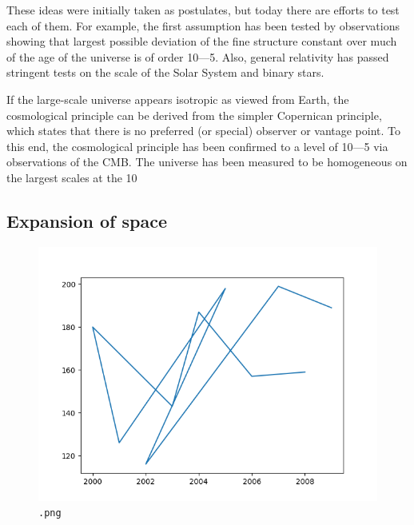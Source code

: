 \documentclass[14pt, oneside]{book}
\begin{document}
			These ideas were initially taken as postulates, but today there are efforts to test each of them. For example, the first assumption has been tested by observations showing that largest possible deviation of the fine structure constant over much of the age of the universe is of order 10---5. Also, general relativity has passed stringent tests on the scale of the Solar System and binary stars.
	
			If the large-scale universe appears isotropic as viewed from Earth, the cosmological principle can be derived from the simpler Copernican principle, which states that there is no preferred (or special) observer or vantage point. To this end, the cosmological principle has been confirmed to a level of 10---5 via observations of the CMB. The universe has been measured to be homogeneous on the largest scales at the 10%
	
			\subsection{Expansion of space}
				\begin{figure}
					\includegraphics[width=\linewidth]{images/plot1.png}
					\caption{\texttt{.png}}
					\label{wrapfig:fig1}
				\end{figure}
	
\end{document}
